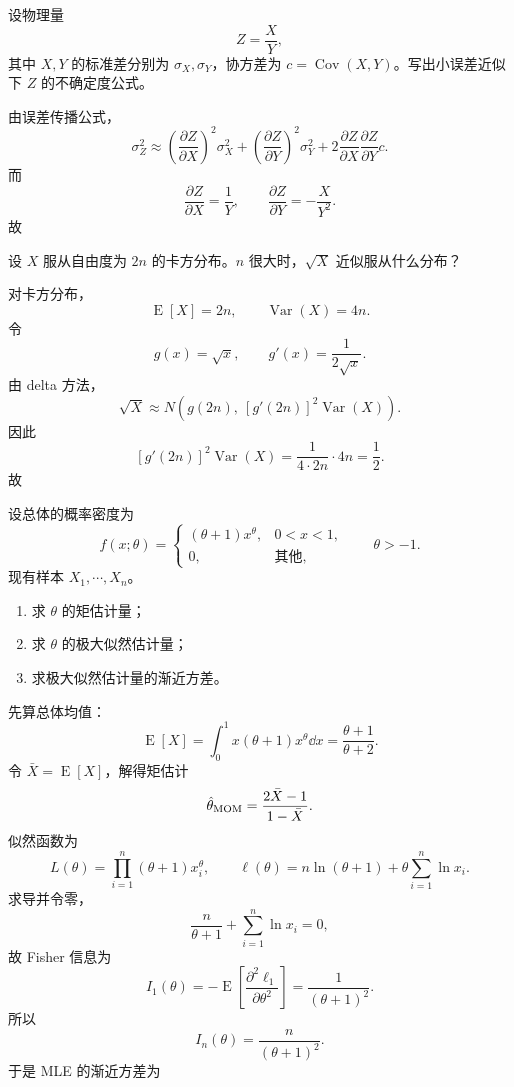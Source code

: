 ﻿

\begin{question}
设物理量
\[
Z=\frac{X}{Y},
\]
其中 $X,Y$ 的标准差分别为 $\sigma_X,\sigma_Y$，协方差为 $c=\operatorname{Cov}(X,Y)$。写出小误差近似下 $Z$ 的不确定度公式。
\begin{solution}
由误差传播公式，
\[
\sigma_Z^2\approx
\left(\frac{\partial Z}{\partial X}\right)^2\sigma_X^2+
\left(\frac{\partial Z}{\partial Y}\right)^2\sigma_Y^2+
2\frac{\partial Z}{\partial X}\frac{\partial Z}{\partial Y}c.
\]
而
\[
\frac{\partial Z}{\partial X}=\frac1Y,\qquad
\frac{\partial Z}{\partial Y}=-\frac{X}{Y^2}.
\]
故
\end{solution}
\end{question}

\begin{question}
设 $X$ 服从自由度为 $2n$ 的卡方分布。$n$ 很大时，$\sqrt{X}$ 近似服从什么分布？
\begin{solution}
对卡方分布，
\[
\operatorname{E}[X]=2n,\qquad \operatorname{Var}(X)=4n.
\]
令
\[
g(x)=\sqrt{x},
\qquad g'(x)=\frac{1}{2\sqrt{x}}.
\]
由 delta 方法，
\[
\sqrt{X}\approx N\!\left(g(2n),\ [g'(2n)]^2\operatorname{Var}(X)\right).
\]
因此
\[
[g'(2n)]^2\operatorname{Var}(X)
=\frac{1}{4\cdot 2n}\cdot 4n=\frac12.
\]
故
\end{solution}
\end{question}

\begin{question}
设总体的概率密度为
\[
f(x;\theta)=\begin{cases}
(\theta+1)x^\theta,&0<x<1,\\
0,&\text{其他},
\end{cases}
\qquad \theta>-1.
\]
现有样本 $X_1,\cdots,X_n$。
\begin{enumerate}[label=(\alph*),leftmargin=2.8em,itemsep=0.2em]
\item 求 $\theta$ 的矩估计量；
\item 求 $\theta$ 的极大似然估计量；
\item 求极大似然估计量的渐近方差。
\end{enumerate}
\begin{solution}
先算总体均值：
\[
\operatorname{E}[X]=\int_0^1 x(\theta+1)x^\theta\dd{x}
=\frac{\theta+1}{\theta+2}.
\]
令 $\bar X=\operatorname{E}[X]$，解得矩估计
\[
\hat\theta_{\rm MOM}=\frac{2\bar X-1}{1-\bar X}.
\]
似然函数为
\[
L(\theta)=\prod_{i=1}^n (\theta+1)x_i^\theta,
\qquad
\ell(\theta)=n\ln(\theta+1)+\theta\sum_{i=1}^n\ln x_i.
\]
求导并令零，
\[
\frac{n}{\theta+1}+\sum_{i=1}^n \ln x_i=0,
\]
故
Fisher 信息为
\[
I_1(\theta)=-\operatorname{E}\!\left[\frac{\partial^2 \ell_1}{\partial \theta^2}\right]
=\frac{1}{(\theta+1)^2}.
\]
所以
\[
I_n(\theta)=\frac{n}{(\theta+1)^2}.
\]
于是 MLE 的渐近方差为
\end{solution}
\end{question}

